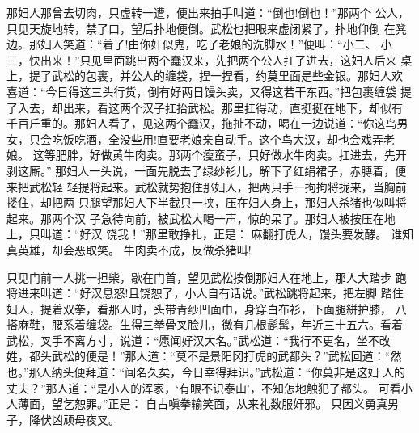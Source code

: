 那妇人那曾去切肉，只虚转一遭，便出来拍手叫道：“倒也!倒也！”那两个
公人，只见天旋地转，禁了口，望后扑地便倒。武松也把眼来虚闭紧了，扑地仰倒
在凳边。那妇人笑道：“着了!由你奸似鬼，吃了老娘的洗脚水！”便叫：“小二、
小三，快出来！”只见里面跳出两个蠢汉来，先把两个公人扛了进去，这妇人后来
桌上，提了武松的包裹，并公人的缠袋，捏一捏看，约莫里面是些金银。那妇人欢
喜道：“今日得这三头行货，倒有好两日馒头卖，又得这若干东西。”把包裹缠袋
提了入去，却出来，看这两个汉子扛抬武松。那里扛得动，直挺挺在地下，却似有
千百斤重的。那妇人看了，见这两个蠢汉，拖扯不动，喝在一边说道：“你这鸟男
女，只会吃饭吃酒，全没些用!直要老娘亲自动手。这个鸟大汉，却也会戏弄老娘。
这等肥胖，好做黄牛肉卖。那两个瘦蛮子，只好做水牛肉卖。扛进去，先开剥这厮。”
那妇人一头说，一面先脱去了绿纱衫儿，解下了红绢裙子，赤膊着，便来把武松轻
轻提将起来。武松就势抱住那妇人，把两只手一拘拘将拢来，当胸前搂住，却把两
只腿望那妇人下半截只一挟，压在妇人身上，那妇人杀猪也似叫将起来。那两个汉
子急待向前，被武松大喝一声，惊的呆了。那妇人被按压在地上，只叫道：“好汉
饶我！”那里敢挣扎，正是：
麻翻打虎人，馒头要发酵。
谁知真英雄，却会恶取笑。
牛肉卖不成，反做杀猪叫!

只见门前一人挑一担柴，歇在门首，望见武松按倒那妇人在地上，那人大踏步
跑将进来叫道：“好汉息怒!且饶恕了，小人自有话说。”武松跳将起来，把左脚
踏住妇人，提着双拳，看那人时，头带青纱凹面巾，身穿白布衫，下面腿絣护膝，
八搭麻鞋，腰系着缠袋。生得三拳骨叉脸儿，微有几根髭髯，年近三十五六。看着
武松，叉手不离方寸，说道：“愿闻好汉大名。”武松道：“我行不更名，坐不改
姓，都头武松的便是！”那人道：“莫不是景阳冈打虎的武都头？”武松回道：“然
也。”那人纳头便拜道：“闻名久矣，今日幸得拜识。”武松道：“你莫非是这妇
人的丈夫？”那人道：“是小人的浑家，‘有眼不识泰山’，不知怎地触犯了都头。
可看小人薄面，望乞恕罪。”正是：
自古嗔拳输笑面，从来礼数服奸邪。
只因义勇真男子，降伏凶顽母夜叉。

